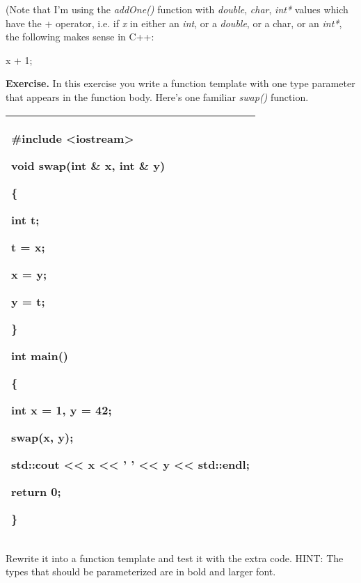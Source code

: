 \documentclass[
]{article}
\begin{document}
(Note that I'm using the \emph{addOne()} function with \emph{double},
\emph{char}, \emph{int*} values which have the + operator, i.e. if
\emph{x} in either an \emph{int}, or a \emph{double}, or a char, or an
\emph{int*}, the following makes sense in C++:

x + 1;

\textbf{Exercise.} In this exercise you write a function template with
one type parameter that appears in the function body. Here's one
familiar \emph{swap()} function.

\begin{longtable}[]{@{}l@{}}
\toprule
\endhead
\begin{minipage}[t]{0.97\columnwidth}\raggedright
\#include \textless iostream\textgreater{}

void swap(int \& x, int \& y)

\{

int t;

t = x;

x = y;

y = t;

\}

int main()

\{

int x = 1, y = 42;

swap(x, y);

std::cout \textless\textless{} x \textless\textless{} ' '
\textless\textless{} y \textless\textless{} std::endl;

return 0;

\} \strut
\end{minipage}\tabularnewline
\bottomrule
\end{longtable}

Rewrite it into a function template and test it with the extra code.
HINT: The types that should be parameterized are in bold and larger
font.
\end{document}
